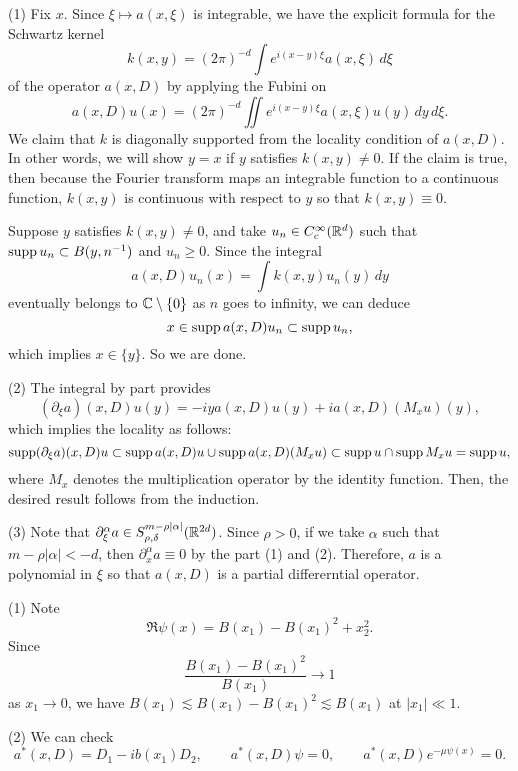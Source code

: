 \documentclass{../../../small}
\begin{document}
\begin{pf}[Solution of 5]
(1)
Fix $x$.
Since $\xi\mapsto a(x,\xi)$ is integrable, we have the explicit formula for the Schwartz kernel
\[k(x,y)=(2\pi)^{-d}\int e^{i(x-y)\xi}a(x,\xi)\,d\xi\]
of the operator $a(x,D)$ by applying the Fubini on
\[a(x,D)u(x)=(2\pi)^{-d}\iint e^{i(x-y)\xi}a(x,\xi)u(y)\,dy\,d\xi.\]
We claim that $k$ is diagonally supported from the locality condition of $a(x,D)$.
In other words, we will show $y=x$ if $y$ satisfies $k(x,y)\ne0$.
If the claim is true, then because the Fourier transform maps an integrable function to a continuous function, $k(x,y)$ is continuous with respect to $y$ so that $k(x,y)\equiv0$.

Suppose $y$ satisfies $k(x,y)\ne0$, and take $u_n\in C_c^\infty(\mathbb{R}^d)$ such that $\operatorname{supp} u_n\subset B(y,n^{-1})$ and $u_n\ge0$.
Since the integral
\[a(x,D)u_n(x)=\int k(x,y)u_n(y)\,dy\]
eventually belongs to $\mathbb{C}\setminus\{0\}$ as $n$ goes to infinity, we can deduce
\[x\in\operatorname{supp} a(x,D)u_n\subset\operatorname{supp} u_n,\]
which implies $x\in\{y\}$.
So we are done.

(2)
The integral by part provides
\[(\partial_\xi a)(x,D)u(y)=-iya(x,D)u(y)+ia(x,D)(M_xu)(y),\]
which implies the locality as follows:
\[\operatorname{supp}(\partial_\xi a)(x,D)u
\subset\operatorname{supp} a(x,D)u \cup \operatorname{supp} a(x,D)(M_xu)
\subset\operatorname{supp} u\cap\operatorname{supp} M_x u=\operatorname{supp} u,\]
where $M_x$ denotes the multiplication operator by the identity function.
Then, the desired result follows from the induction.

(3)
Note that $\partial_\xi^\alpha a\in S^{m-\rho|\alpha|}_{\rho,\delta}(\mathbb{R}^{2d})$.
Since $\rho>0$, if we take $\alpha$ such that $m-\rho|\alpha|<-d$, then $\partial_x^\alpha a\equiv0$ by the part (1) and (2).
Therefore, $a$ is a polynomial in $\xi$ so that $a(x,D)$ is a partial differerntial operator.
\end{pf}

\begin{pf}[Solution of 6]
(1)
Note
\[\Re\psi(x)=B(x_1)-B(x_1)^2+x_2^2.\]
Since
\[\frac{B(x_1)-B(x_1)^2}{B(x_1)}\to1\]
as $x_1\to0$, we have $B(x_1)\lesssim B(x_1)-B(x_1)^2\lesssim B(x_1)$ at $|x_1|\ll1$.

(2)
We can check
\[a^*(x,D)=D_1-ib(x_1)D_2,\qquad a^*(x,D)\psi=0,\qquad a^*(x,D)e^{-\mu\psi(x)}=0.\]


\end{pf}
\end{document}
